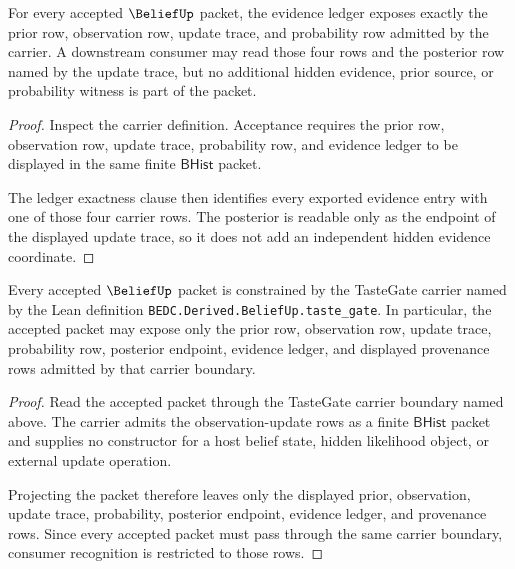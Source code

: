 \begin{theorem}
\label{thm:belief-ledger-exactness-obligation}
For every accepted $\BeliefUp$ packet, the evidence ledger exposes exactly the
prior row, observation row, update trace, and probability row admitted by the
carrier. A downstream consumer may read those four rows and the posterior row
named by the update trace, but no additional hidden evidence, prior source, or
probability witness is part of the packet.
\end{theorem}
\begin{proof}
Inspect the carrier definition. Acceptance requires the prior row, observation
row, update trace, probability row, and evidence ledger to be displayed in the
same finite $\mathsf{BHist}$ packet.

The ledger exactness clause then identifies every exported evidence entry with
one of those four carrier rows. The posterior is readable only as the endpoint
of the displayed update trace, so it does not add an independent hidden
evidence coordinate.
\end{proof}

\begin{theorem}
\label{thm:belief-tastegate-carrier-recognition}
Every accepted $\BeliefUp$ packet is constrained by the TasteGate carrier named
by the Lean definition
\texttt{BEDC.Derived.BeliefUp.taste\_gate}. In particular, the accepted packet
may expose only the prior row, observation row, update trace, probability row,
posterior endpoint, evidence ledger, and displayed provenance rows admitted by
that carrier boundary.
\end{theorem}
\begin{proof}
Read the accepted packet through the TasteGate carrier boundary named above. The
carrier admits the observation-update rows as a finite $\mathsf{BHist}$ packet
and supplies no constructor for a host belief state, hidden likelihood object, or
external update operation.

Projecting the packet therefore leaves only the displayed prior, observation,
update trace, probability, posterior endpoint, evidence ledger, and provenance
rows. Since every accepted packet must pass through the same carrier boundary,
consumer recognition is restricted to those rows.
\end{proof}

